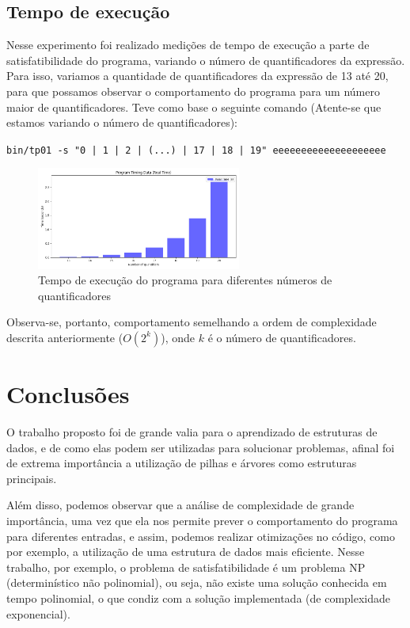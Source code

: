 \documentclass{article}
\begin{document}
\subsection{Tempo de execução}

Nesse experimento foi realizado medições de tempo de execução a parte de satisfatibilidade do programa, variando o número de quantificadores da expressão. Para isso,
variamos a quantidade de quantificadores da expressão de 13 até 20, para que possamos observar o comportamento do programa para um número maior de quantificadores.
Teve como base o seguinte comando (Atente-se que estamos variando o número de quantificadores): 


\verb#bin/tp01 -s "0 | 1 | 2 | (...) | 17 | 18 | 19" eeeeeeeeeeeeeeeeeeee#

\begin{figure}[H]
    \centering
    \includegraphics[width=0.6\textwidth]{./images/time.png}
    \caption{Tempo de execução do programa para diferentes números de quantificadores}
    \label{fig:time}
\end{figure}


Observa-se, portanto, comportamento semelhando a ordem de complexidade descrita anteriormente ($O(2^k)$), onde $k$ é o número de quantificadores.

\section{Conclusões}

O trabalho proposto foi de grande valia para o aprendizado de estruturas de dados, e de como elas podem ser utilizadas para solucionar problemas, afinal foi de extrema importância a utilização de pilhas e árvores como estruturas principais.  

Além disso, podemos observar que a análise de complexidade de grande importância, uma vez que ela nos permite prever o comportamento do programa para diferentes entradas, e assim, podemos realizar otimizações no código, como por exemplo, a utilização de uma estrutura de dados mais eficiente. Nesse trabalho, por exemplo, o problema de satisfatibilidade é um problema NP (determinístico não polinomial), ou seja, não existe uma solução conhecida em tempo polinomial, o que condiz com a solução implementada (de complexidade exponencial).
\end{document}

